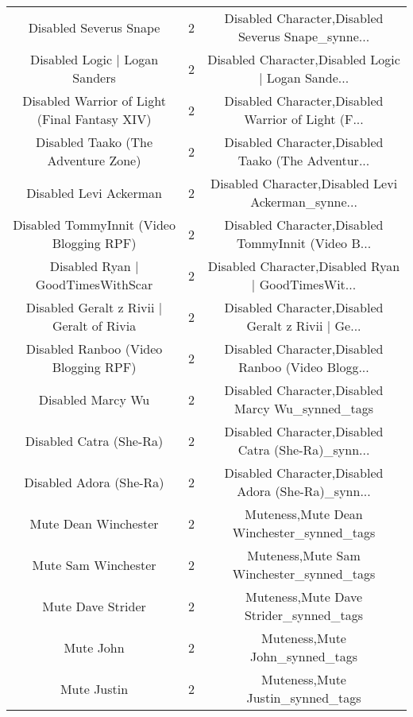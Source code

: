 \begin{table}[h!]
{\begin{tabular}{|c|c|c|}
                            Disabled Severus Snape &          2 & Disabled Character,Disabled Severus Snape\_synne... \\
                    Disabled Logic | Logan Sanders &          2 & Disabled Character,Disabled Logic | Logan Sande... \\
     Disabled Warrior of Light (Final Fantasy XIV) &          2 & Disabled Character,Disabled Warrior of Light (F... \\
               Disabled Taako (The Adventure Zone) &          2 & Disabled Character,Disabled Taako (The Adventur... \\
                            Disabled Levi Ackerman &          2 & Disabled Character,Disabled Levi Ackerman\_synne... \\
          Disabled TommyInnit (Video Blogging RPF) &          2 & Disabled Character,Disabled TommyInnit (Video B... \\
                 Disabled Ryan | GoodTimesWithScar &          2 & Disabled Character,Disabled Ryan | GoodTimesWit... \\
         Disabled Geralt z Rivii | Geralt of Rivia &          2 & Disabled Character,Disabled Geralt z Rivii | Ge... \\
              Disabled Ranboo (Video Blogging RPF) &          2 & Disabled Character,Disabled Ranboo (Video Blogg... \\
                                 Disabled Marcy Wu &          2 &   Disabled Character,Disabled Marcy Wu\_synned\_tags \\
                           Disabled Catra (She-Ra) &          2 & Disabled Character,Disabled Catra (She-Ra)\_synn... \\
                           Disabled Adora (She-Ra) &          2 & Disabled Character,Disabled Adora (She-Ra)\_synn... \\
                              Mute Dean Winchester &          2 &          Muteness,Mute Dean Winchester\_synned\_tags \\
                               Mute Sam Winchester &          2 &           Muteness,Mute Sam Winchester\_synned\_tags \\
                                 Mute Dave Strider &          2 &             Muteness,Mute Dave Strider\_synned\_tags \\
                                         Mute John &          2 &                     Muteness,Mute John\_synned\_tags \\
                                       Mute Justin &          2 &                   Muteness,Mute Justin\_synned\_tags \\

\end{tabular}}
\end{table}
